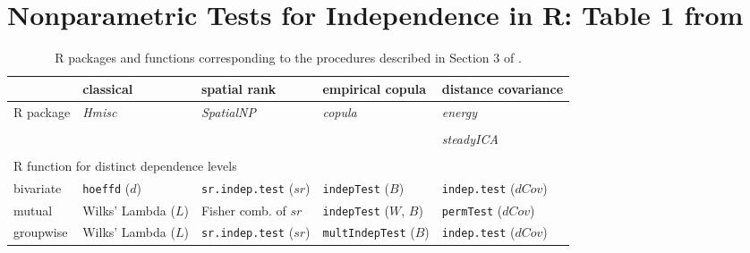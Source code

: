 \documentclass[11pt]{article}
\begin{document}
	\section*{Nonparametric Tests for Independence in R: Table 1 from \cite{HerMax18}}
	
\begin{table}[ht]
 \caption{\textsf{R} packages and functions corresponding to the procedures described in Section 3 of \cite{HerMax18}. }
\label{tab:Rpack}\small{\centering
  \begin{tabular}{lllll}\toprule
 
   &classical  & spatial rank  &  empirical copula  & distance covariance \\    
		\midrule\midrule
\textsf{R} package& \textit{Hmisc} &\textit{SpatialNP} &\textit{copula} &\textit{energy}  \\
&\citep{Hmisc}&\citep{SpatialNP}&\citep{copula}&\citep{energy}\\
&&&&\textit{steadyICA} \\
&&&&\citep{steadyICA}\\
\midrule
\multicolumn{3}{l}{\textsf{R} function for distinct dependence levels}&&\\
 bivariate &\texttt{hoeffd} ($d$)&\texttt{sr.indep.test} ($sr$)&\texttt{indepTest} ($B$)&\texttt{indep.test} ($dCov$)\\
 mutual &Wilks' Lambda ($L$)& Fisher comb. of $sr$&\texttt{indepTest} ($W$, $B$)&\texttt{permTest} ($dCov$)\\
 groupwise &Wilks' Lambda ($L$)&\texttt{sr.indep.test} ($sr$)&\texttt{multIndepTest} ($B$)&\texttt{indep.test} ($dCov$)\\
  \bottomrule
  \end{tabular}                     }
\end{table}




\end{document}
